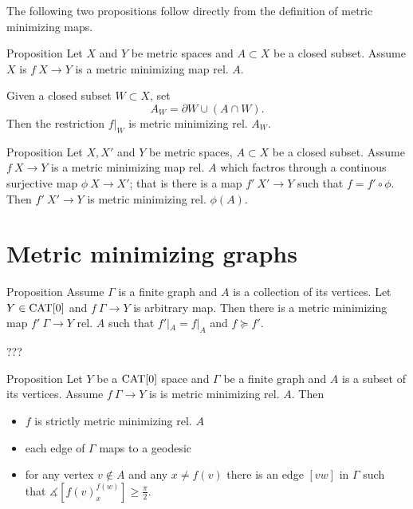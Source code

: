 \documentclass[a4paper,10pt]{amsart}
\begin{document}
The following two propositions follow directly from the definition of metric minimizing maps.

\begin{thm}{Proposition}\label{prop:subset}
Let $X$ and $Y$ be metric spaces and $A\subset X$ be a closed subset.
Assume $X$ is $f\:X\to Y$ is a metric minimizing map rel. $A$.

Given a closed subset $W\subset X$, set 
\[A_W=\partial W\cup (A\cap W).\]
Then the restriction $f|_W$ is metric minimizing rel. $A_W$.
\end{thm}

\begin{thm}{Proposition}\label{prop:factor}
Let $X, X'$ and $Y$ be metric spaces, 
$A\subset X$ be a closed subset.
Assume $f\:X\to Y$ is a metric minimizing map rel. $A$
which factros through a continous surjective map $\phi\:X\to X'$;
that is there is a map $f'\:X'\to Y$ such that $f=f'\circ\phi$.
Then $f'\:X'\to Y$ is metric minimizing rel. $\phi(A)$.
\end{thm}

\section{Metric minimizing graphs}



\begin{thm}{Proposition}
Assume $\Gamma$ is a  finite graph and $A$ is a collection of its vertices.
Let $Y\in\mathop{\rm CAT}\nolimits[0]$ and $f\:\Gamma\to Y$ is arbitrary map.
Then there is a metric minimizing map $f'\:\Gamma\to Y$ rel. $A$ such that
$f'|_A=f|_A$ and 
$f\succcurlyeq f'$.
\end{thm} 

???\qeds

\begin{thm}{Proposition}\label{prop:metric-min-graph}
Let $Y$ be a $\mathop{\rm CAT}\nolimits[0]$ space 
and $\Gamma$ be a finite  graph and $A$ is a subset of its vertices.
Assume $f\:\Gamma\to Y$ is is metric minimizing rel. $A$.
Then
\begin{itemize}
\item $f$ is strictly metric minimizing rel. $A$ 
\item each edge of $\Gamma$ maps to a geodesic
\item for any vertex $v\notin A$ and any $x\ne f(v)$
there is an edge  $[vw]$ in $\Gamma$ such that
$\measuredangle[f(v)^{f(w)}_x]\ge \tfrac\pi2$.
\end{itemize}

\end{thm}
\end{document}
